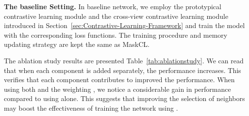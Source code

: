 \documentclass[10pt,twocolumn,letterpaper]{article}
\newcommand{\myparagraph}[1]{\noindent\textbf{#1.}}
\begin{document}
\myparagraph{The baseline Setting} In baseline network, we employ the prototypical contrastive learning module and the cross-view contrastive learning module introduced in Section~\ref{sec:Contrastive-Learning-Framework} and train the model with the corresponding loss functions. The training procedure and memory updating strategy are kept the same as MaskCL. 


The ablation study results are presented Table~\ref{tab:ablationstudy}. We can read that when each component is added separately, the performance increases. This verifies that each component contributes to improved the performance.
When using both  and the weighting , we notice a considerable gain in performance compared to using  alone. This suggests that improving the selection of neighbors may boost the effectiveness of training the network using .
\end{document}
